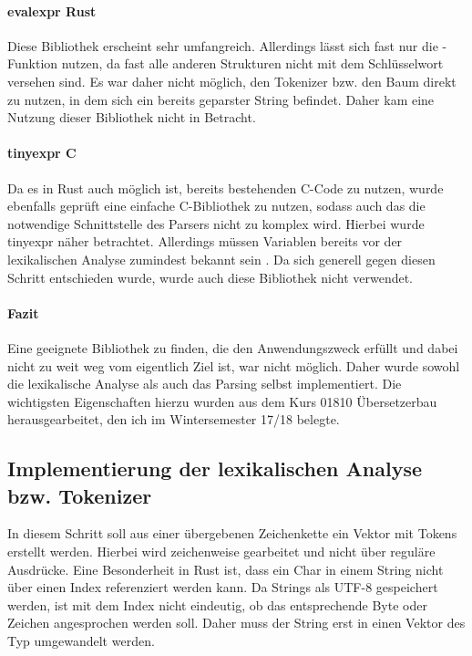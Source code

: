 \documentclass[11pt,a4paper, ngerman]{article}
\begin{document}
\paragraph{evalexpr Rust} \cite{CrateEvalexpr} Diese Bibliothek erscheint sehr umfangreich. Allerdings lässt sich fast nur die -Funktion nutzen, da fast alle anderen Strukturen nicht mit dem Schlüsselwort  versehen sind. Es war daher nicht möglich, den Tokenizer bzw. den Baum direkt zu nutzen, in dem sich ein bereits geparster String befindet. Daher kam eine Nutzung dieser Bibliothek nicht in Betracht.

\paragraph{tinyexpr C} \cite{CTinyexpr} Da es in Rust auch möglich ist, bereits bestehenden C-Code zu nutzen, wurde ebenfalls geprüft eine einfache C-Bibliothek zu nutzen, sodass auch das die notwendige Schnittstelle des Parsers nicht zu komplex wird. Hierbei wurde tinyexpr näher betrachtet. Allerdings müssen Variablen bereits vor der lexikalischen Analyse zumindest bekannt sein \cite{CTinyexprReadme}. Da sich generell gegen diesen Schritt entschieden wurde, wurde auch diese Bibliothek nicht verwendet.

\paragraph{Fazit} Eine geeignete Bibliothek zu finden, die den Anwendungszweck erfüllt und dabei nicht zu weit weg vom eigentlich Ziel ist, war nicht möglich. Daher wurde sowohl die lexikalische Analyse als auch das Parsing selbst implementiert. Die wichtigsten Eigenschaften hierzu wurden aus dem Kurs 01810 Übersetzerbau herausgearbeitet, den ich im Wintersemester 17/18 belegte.

\subsection{Implementierung der lexikalischen Analyse bzw. Tokenizer} In diesem Schritt soll aus einer übergebenen Zeichenkette ein Vektor mit Tokens erstellt werden. Hierbei wird zeichenweise gearbeitet und nicht über reguläre Ausdrücke. Eine Besonderheit in Rust ist, dass ein Char in einem String nicht über einen Index referenziert werden kann. Da Strings als UTF-8 gespeichert werden, ist mit dem Index nicht eindeutig, ob das entsprechende Byte oder Zeichen angesprochen werden soll. Daher muss der String erst in einen Vektor des Typ  umgewandelt werden.
\end{document}
